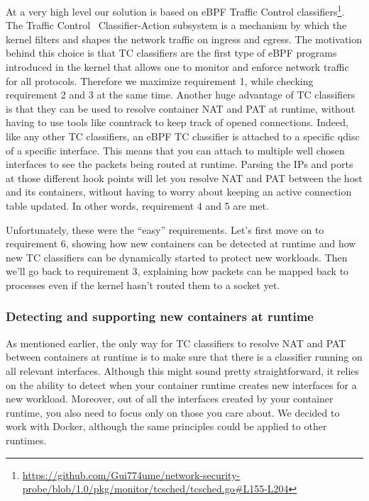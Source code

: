 At a very high level our solution is based on eBPF Traffic Control classifiers\footnote{\url{https://github.com/Gui774ume/network-security-probe/blob/1.0/pkg/monitor/tcsched/tcsched.go#L155-L204}}. The Traffic Control~\cite{ProcessLevelNetworkSecurityMonitoring:TrafficControlManpage} Classifier-Action subsystem is a mechanism by which the kernel filters and shapes the network traffic on ingress and egress. The motivation behind this choice is that TC classifiers are the first type of eBPF programs introduced in the kernel that allows one to monitor and enforce network traffic for all protocols. Therefore we maximize requirement 1, while checking requirement 2 and 3 at the same time. Another huge advantage of TC classifiers is that they can be used to resolve container NAT and PAT at runtime, without having to use tools like conntrack to keep track of opened connections. Indeed, like any other TC classifiers, an eBPF TC classifier is attached to a specific qdisc of a specific interface. This means that you can attach to multiple well chosen interfaces to see the packets being routed at runtime. Parsing the IPs and ports at those different hook points will let you resolve NAT and PAT between the host and its containers, without having to worry about keeping an active connection table updated. In other words, requirement 4 and 5 are met.

Unfortunately, these were the “easy” requirements. Let’s first move on to requirement 6, showing how new containers can be detected at runtime and how new TC classifiers can be dynamically started to protect new workloads. Then we’ll go back to requirement 3, explaining how packets can be mapped back to processes even if the kernel hasn’t routed them to a socket yet.

\subsubsection{Detecting and supporting new containers at runtime}

As mentioned earlier, the only way for TC classifiers to resolve NAT and PAT between containers at runtime is to make sure that there is a classifier running on all relevant interfaces. Although this might sound pretty straightforward, it relies on the ability to detect when your container runtime creates new interfaces for a new workload. Moreover, out of all the interfaces created by your container runtime, you also need to focus only on those you care about. We decided to work with Docker, although the same principles could be applied to other runtimes.

